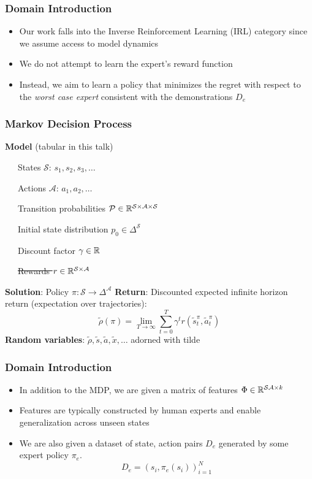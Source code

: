 \documentclass{beamer}
\begin{document}
\begin{frame}
\frametitle{Domain Introduction}
	\begin{itemize}
		\item Our work falls into the Inverse Reinforcement Learning (IRL) category since we assume access to model dynamics
		\item We do not attempt to learn the expert's reward function
		\item Instead, we aim to learn a policy that minimizes the regret with respect to the \emph{worst case expert} consistent with the demonstrations $D_e$
	\end{itemize}
\end{frame}

\begin{frame} \frametitle{Markov Decision Process}
  \textbf{Model} (tabular in this talk) \par
    {\small
   ~~~States $\mathcal{S}$: $s_1, s_2, s_3, \dots $ \par
   ~~~Actions $\mathcal{A}$: $a_1, a_2, \dots $ \par
   ~~~Transition probabilities $\mathcal{P} \in \mathbb{R}^{\mathcal{S} \times \mathcal{A} \times \mathcal{S} }$ \par
   ~~~Initial state distribution $p_0 \in \Delta^\mathcal{S}$ \par
   ~~~Discount factor $\gamma \in \mathbb{R}$ \par
   ~~~\sout{Rewards $r \in \mathbb{R}^{\mathcal{S} \times \mathcal{A}}$}}
    \vfill 
    \textbf{Solution}: Policy ${\pi}\colon \mathcal{S} \to \Delta^\mathcal{A}$
    \vfill
    \textbf{Return}: Discounted expected infinite horizon return (expectation over trajectories):
    \[
	    \tilde{\rho}(\pi) = \lim_{T \to \infty} \sum_{t=0}^T \gamma^t r(\tilde{s}^{\pi}_t, \tilde{a}^{{\pi}}_t)
    \]
    \vfill
    \textbf{Random variables}: $\tilde{\rho}, \tilde{s}, \tilde{a}, \tilde{x}, \dots $ adorned with tilde
\end{frame}

\begin{frame}
	\frametitle{Domain Introduction}
	\begin{itemize}
		\item In addition to the MDP, we are given a matrix of features $\Phi \in \mathbb{R}^{\mathcal{S}\mathcal{A} \times k}$
		\item Features are typically constructed by human experts and enable generalization across unseen states
		\item We are also given a dataset of state, action pairs $D_e$ generated by some expert policy $\pi_e$. \[ D_e = (s_i, \pi_e(s_i))_{i=1}^N \]
	\end{itemize}
\end{frame}
\end{document}
